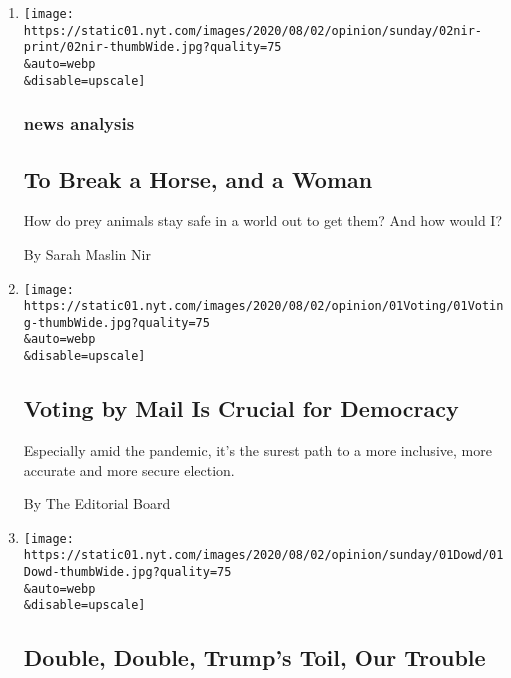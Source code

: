 \begin{enumerate}
\def\labelenumi{\arabic{enumi}.}
\item
  \href{/2020/08/02/sunday-review/horse-crazy-nir-language.html}{}

  \texttt{[image: https://static01.nyt.com/images/2020/08/02/opinion/sunday/02nir-print/02nir-thumbWide.jpg?quality=75\\\&auto=webp\\\&disable=upscale]}

  \hypertarget{news-analysis}{%
  \subsubsection{news analysis}\label{news-analysis}}

  \hypertarget{to-break-a-horse-and-a-woman}{%
  \subsection{To Break a Horse, and a
  Woman}\label{to-break-a-horse-and-a-woman}}

  How do prey animals stay safe in a world out to get them? And how
  would I?

  By Sarah Maslin Nir
\item
  \href{/2020/08/01/opinion/sunday/mail-voting-covid-2020-election.html}{}

  \texttt{[image: https://static01.nyt.com/images/2020/08/02/opinion/01Voting/01Voting-thumbWide.jpg?quality=75\\\&auto=webp\\\&disable=upscale]}

  \hypertarget{voting-by-mail-is-crucial-for-democracy}{%
  \subsection{Voting by Mail Is Crucial for
  Democracy}\label{voting-by-mail-is-crucial-for-democracy}}

  Especially amid the pandemic, it's the surest path to a more
  inclusive, more accurate and more secure election.

  By The Editorial Board
\item
  \href{/2020/08/01/opinion/sunday/trump-coronavirus-herman-cain.html}{}

  \texttt{[image: https://static01.nyt.com/images/2020/08/02/opinion/sunday/01Dowd/01Dowd-thumbWide.jpg?quality=75\\\&auto=webp\\\&disable=upscale]}

  \hypertarget{double-double-trumps-toil-our-trouble}{%
  \subsection{Double, Double, Trump's Toil, Our
  Trouble}\label{double-double-trumps-toil-our-trouble}}


\end{enumerate}
